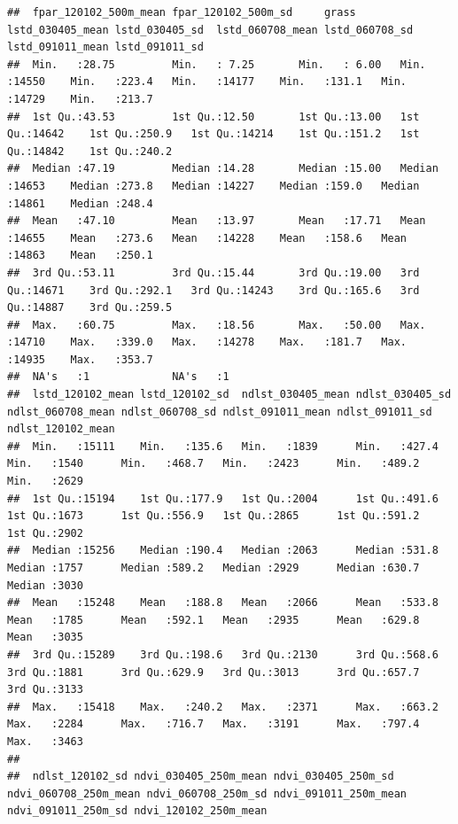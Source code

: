 \documentclass[
  10pt,
  b5paper,
  oneside]{book}
\begin{document}
\begin{verbatim}
##  fpar_120102_500m_mean fpar_120102_500m_sd     grass       lstd_030405_mean lstd_030405_sd  lstd_060708_mean lstd_060708_sd  lstd_091011_mean lstd_091011_sd 
##  Min.   :28.75         Min.   : 7.25       Min.   : 6.00   Min.   :14550    Min.   :223.4   Min.   :14177    Min.   :131.1   Min.   :14729    Min.   :213.7  
##  1st Qu.:43.53         1st Qu.:12.50       1st Qu.:13.00   1st Qu.:14642    1st Qu.:250.9   1st Qu.:14214    1st Qu.:151.2   1st Qu.:14842    1st Qu.:240.2  
##  Median :47.19         Median :14.28       Median :15.00   Median :14653    Median :273.8   Median :14227    Median :159.0   Median :14861    Median :248.4  
##  Mean   :47.10         Mean   :13.97       Mean   :17.71   Mean   :14655    Mean   :273.6   Mean   :14228    Mean   :158.6   Mean   :14863    Mean   :250.1  
##  3rd Qu.:53.11         3rd Qu.:15.44       3rd Qu.:19.00   3rd Qu.:14671    3rd Qu.:292.1   3rd Qu.:14243    3rd Qu.:165.6   3rd Qu.:14887    3rd Qu.:259.5  
##  Max.   :60.75         Max.   :18.56       Max.   :50.00   Max.   :14710    Max.   :339.0   Max.   :14278    Max.   :181.7   Max.   :14935    Max.   :353.7  
##  NA's   :1             NA's   :1                                                                                                                             
##  lstd_120102_mean lstd_120102_sd  ndlst_030405_mean ndlst_030405_sd ndlst_060708_mean ndlst_060708_sd ndlst_091011_mean ndlst_091011_sd ndlst_120102_mean
##  Min.   :15111    Min.   :135.6   Min.   :1839      Min.   :427.4   Min.   :1540      Min.   :468.7   Min.   :2423      Min.   :489.2   Min.   :2629     
##  1st Qu.:15194    1st Qu.:177.9   1st Qu.:2004      1st Qu.:491.6   1st Qu.:1673      1st Qu.:556.9   1st Qu.:2865      1st Qu.:591.2   1st Qu.:2902     
##  Median :15256    Median :190.4   Median :2063      Median :531.8   Median :1757      Median :589.2   Median :2929      Median :630.7   Median :3030     
##  Mean   :15248    Mean   :188.8   Mean   :2066      Mean   :533.8   Mean   :1785      Mean   :592.1   Mean   :2935      Mean   :629.8   Mean   :3035     
##  3rd Qu.:15289    3rd Qu.:198.6   3rd Qu.:2130      3rd Qu.:568.6   3rd Qu.:1881      3rd Qu.:629.9   3rd Qu.:3013      3rd Qu.:657.7   3rd Qu.:3133     
##  Max.   :15418    Max.   :240.2   Max.   :2371      Max.   :663.2   Max.   :2284      Max.   :716.7   Max.   :3191      Max.   :797.4   Max.   :3463     
##                                                                                                                                                          
##  ndlst_120102_sd ndvi_030405_250m_mean ndvi_030405_250m_sd ndvi_060708_250m_mean ndvi_060708_250m_sd ndvi_091011_250m_mean ndvi_091011_250m_sd ndvi_120102_250m_mean

\end{verbatim}
\end{document}
